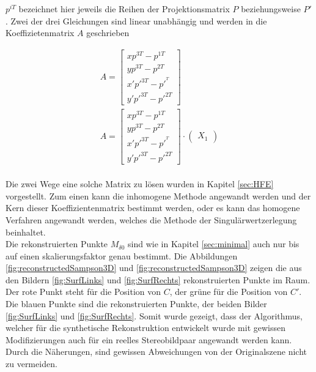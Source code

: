 $p^{iT}$ bezeichnet hier jeweils die Reihen der Projektionsmatrix $P$ beziehungsweise $P'$. Zwei der drei Gleichungen sind linear unabhängig und werden in die Koeffizietenmatrix $A$ geschrieben 



\begin{gather}
A = \begin{bmatrix}
xp^{3T}-p^{1T}\\
yp^{3T}-p^{2T}\\
x'p'^{3T}-p'^{^T}\\
y'p'^{3T}-p'^{2T}
\end{bmatrix}\\
A = \begin{bmatrix}
	xp^{3T}-p^{1T}\\
	yp^{3T}-p^{2T}\\
	x'p'^{3T}-p'^{^T}\\
	y'p'^{3T}-p'^{2T}
\end{bmatrix} \cdot
\begin{pmatrix}
	X_1
\end{pmatrix}
\end{gather}\\

Die zwei Wege eine solche Matrix zu lösen wurden in Kapitel \ref{sec:HFE} vorgestellt. Zum einen kann die inhomogene Methode angewandt werden und der Kern dieser Koeffizientenmatrix bestimmt werden, oder es kann das homogene Verfahren angewandt werden, welches die Methode der Singulärwertzerlegung beinhaltet. \\

Die rekonstruierten Punkte $M_{\delta 0}$ sind wie in Kapitel \ref{sec:minimal} auch nur bis auf einen skalierungsfaktor genau bestimmt. Die Abbildungen \ref{fig:reconstructedSampson3D} und \ref{fig:reconstructedSampson3D} zeigen die aus den Bildern \ref{fig:SurfLinks} und \ref{fig:SurfRechts} rekonstruierten Punkte im Raum. Der rote Punkt steht für die Position von $C$, der grüne für die Position von $C'$. Die blauen Punkte sind die rekonstruierten Punkte, der beiden Bilder \ref{fig:SurfLinks} und \ref{fig:SurfRechts}. Somit wurde gezeigt, dass der Algorithmus, welcher für die synthetische Rekonstruktion entwickelt wurde mit gewissen Modifizierungen auch für ein reelles Stereobildpaar angewandt werden kann. Durch die Näherungen, sind gewissen Abweichungen von der Originalszene nicht zu vermeiden.

